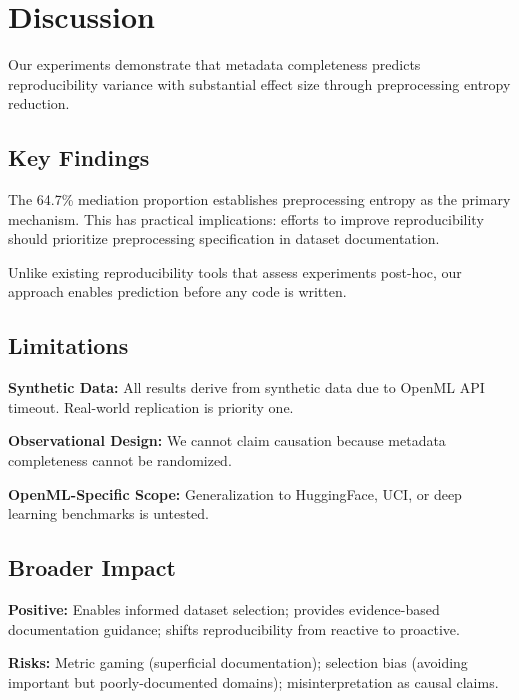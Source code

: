 \section{Discussion}

Our experiments demonstrate that metadata completeness predicts reproducibility variance with substantial effect size through preprocessing entropy reduction.

\subsection{Key Findings}

The 64.7\% mediation proportion establishes preprocessing entropy as the primary mechanism. This has practical implications: efforts to improve reproducibility should prioritize preprocessing specification in dataset documentation.

Unlike existing reproducibility tools that assess experiments post-hoc, our approach enables prediction before any code is written.

\subsection{Limitations}

\textbf{Synthetic Data:} All results derive from synthetic data due to OpenML API timeout. Real-world replication is priority one.

\textbf{Observational Design:} We cannot claim causation because metadata completeness cannot be randomized.

\textbf{OpenML-Specific Scope:} Generalization to HuggingFace, UCI, or deep learning benchmarks is untested.

\subsection{Broader Impact}

\textbf{Positive:} Enables informed dataset selection; provides evidence-based documentation guidance; shifts reproducibility from reactive to proactive.

\textbf{Risks:} Metric gaming (superficial documentation); selection bias (avoiding important but poorly-documented domains); misinterpretation as causal claims.
